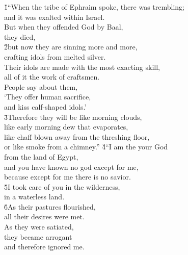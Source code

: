 \begin{poetry}
\poeml {}
\v{1}``When the tribe of Ephraim spoke, there was trembling; \\
\poemll    and it was exalted within Israel. \\
\poeml But when they offended God by Baal, \\
\poemll    they died, \\
\poeml \v{2}but now they are sinning more and more, \\
\poemll    crafting idols from melted silver. \\
\poeml Their idols are made with the most exacting skill, \\
\poemll    all of it the work of craftsmen. \\
\poeml People say about them, \\
\poemll    `They offer human sacrifice, \\
\poemlll       and kiss calf-shaped idols.' \\
\poeml \v{3}Therefore they will be like morning clouds, \\
\poemll    like early morning dew that evaporates, \\
\poeml like chaff blown away from the threshing floor, \\
\poemll    or like smoke from a chimney.''
\poeml \v{4}``I am the  your God \\
\poemll    from the land of Egypt, \\
\poeml and you have known no god except for me, \\
\poemll    because except for me there is no savior. \\
\poeml \v{5}I took care of you in the wilderness, \\
\poemll    in a waterless land. \\
\poeml \v{6}As their pastures flourished, \\
\poemll    all their desires were met. \\
\poeml As they were satiated, \\
\poemll    they became arrogant \\
\poemlll       and therefore ignored me. \\

\end{poetry}
